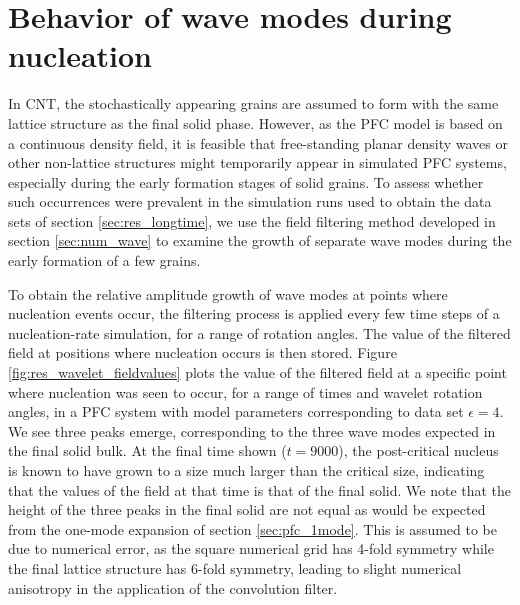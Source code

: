 \section{Behavior of wave modes during nucleation}\label{sec:res_wavemodes}

In CNT, the stochastically appearing grains are assumed to form with the same lattice structure as the final solid phase. However, as the PFC model is based on a continuous density field, it is feasible that free-standing planar density waves or other non-lattice structures might temporarily appear in simulated PFC systems, especially during the early formation stages of solid grains. To assess whether such occurrences were prevalent in the simulation runs used to obtain the data sets of section \ref{sec:res_longtime}, we use the field filtering method developed in section \ref{sec:num_wave} to examine the growth of separate wave modes during the early formation of a few grains.

To obtain the relative amplitude growth of wave modes at points where nucleation events occur, the filtering process is applied every few time steps of a nucleation-rate simulation, for a range of rotation angles. The value of the filtered field at positions where nucleation occurs is then stored. Figure \ref{fig:res_wavelet_fieldvalues} plots the value of the filtered field at a specific point where nucleation was seen to occur, for a range of times and wavelet rotation angles, in a PFC system with model parameters corresponding to data set $\epsilon=4$. We see three peaks emerge, corresponding to the three wave modes expected in the final solid bulk. At the final time shown ($t=9000$), the post-critical nucleus is known to have grown to a size much larger than the critical size, indicating that the values of the field at that time is that of the final solid. We note that the height of the three peaks in the final solid are not equal as would be expected from the one-mode expansion of section \ref{sec:pfc_1mode}. This is assumed to be due to numerical error, as the square numerical grid has 4-fold symmetry while the final lattice structure has 6-fold symmetry, leading to slight numerical anisotropy in the application of the convolution filter.


